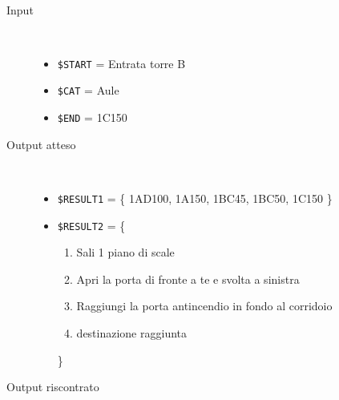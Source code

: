 \documentclass[../../SperimentazioniPratiche.tex]{subfiles}
\begin{document}
			\paragraph*{}
			\label{2Prova1A.1}
			\begin{tcolorbox}[fonttitle=\bfseries, 
								adjusted title={\Large Prova 1A.1}, 
								breakable, 
								sharp corners=south,
								colback=white, 
								colframe=white!60!black]
								
				\begin{description}
				
					\item[Input] \ \par 
        				\begin{itemize}
        					\item \verb|$START| = Entrata torre B
        					\item \verb|$CAT| = Aule
							\item \verb|$END| = 1C150
        				\end{itemize}
        				
        			\tcbline 
        				
        			\item[Output atteso] \ \par
        				\begin{itemize}
        				
        					\item \verb|$RESULT1| = \{
        						1AD100, 1A150, 1BC45, 1BC50, 1C150
        					\}
        				
        					\item \verb|$RESULT2| = \{
        					\begin{enumerate}
        						\item Sali 1 piano di scale
								\item Apri la porta di fronte a te e svolta a sinistra
								\item Raggiungi la porta antincendio in fondo al corridoio
								\item destinazione raggiunta
        					\end{enumerate}
        					\}
        					
        				\end{itemize}

					\tcbline				
        				
        			\item[Output riscontrato] \ \par
        				\begin{description}
        				

\end{description}
\end{description}
\end{tcolorbox}
\end{document}
